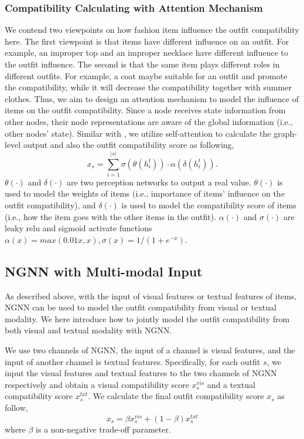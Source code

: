 \documentclass[sigconf]{acmart}
\begin{document}
\subsubsection{Compatibility Calculating with Attention Mechanism}
We contend two viewpoints on how fashion item influence the outfit compatibility here.
The first viewpoint is that items have different influence on an outfit. For example, an improper top and an improper necklace have different influence to the outfit influence.
The second is that the same item plays different roles in different outfits. For example, a coat maybe suitable for an outfit and promote the compatibility, while it will decrease the compatibility together with summer clothes.
Thus, we aim to design an attention mechanism to model the influence of items on the outfit compatibility.
Since a node receives state information from other nodes, their node representations are aware of the global information (i.e., other nodes' state). Similar with \cite{li2015gated}, we utilize self-attention  \cite{Tan2017Deep,vaswani2017attention} to calculate the graph-level output and also the outfit compatibility score as following,
\begin{equation} \label{self_attention}
x_{s} = \sum_{i=1}^{\left | s \right |} \sigma(\theta(h_{i}^{t})) \cdot \alpha(\delta(h_{i}^{t})).
\end{equation}
$\theta(\cdot)$ and $\delta(\cdot)$ are two perception networks to output a real value.
$\theta(\cdot)$ is used to model the weights of items (i.e., importance of items' influence on the outfit compatibility), and $\delta(\cdot)$ is used to model the compatibility score of items (i.e., how the item goes with the other items in the outfit).
$\alpha (\cdot)$ and $\sigma(\cdot)$ are leaky relu and sigmoid activate functions $\alpha(x)=max(0.01x, x), \sigma(x)=1/(1+e^{-x})$.

\subsection{NGNN with Multi-modal Input} \label{sect:multi}
As described above, with the input of visual features or textual features of items, NGNN can be used to model the outfit compatibility from visual or textual modality. We here introduce how to jointly model the outfit compatibility from both visual and textual modality with NGNN.


 We use two channels of NGNN, the input of a channel is visual features, and the input of another channel is textual features.
 Specifically, for each outfit $s$, we input the visual features and textual features to the two channels of NGNN respectively and obtain a visual compatibility score $x_s^{vis}$ and a textual compatibility score $x_{s}^{txt}$. We calculate the final outfit compatibility score $x_{s}$ as follow,
\begin{equation} \label{compatibility}
x_{s}=\beta x_{s}^{vis}+(1-\beta)x_{s}^{txt}
\end{equation}
where $\beta$ is a non-negative trade-off parameter.
\end{document}
